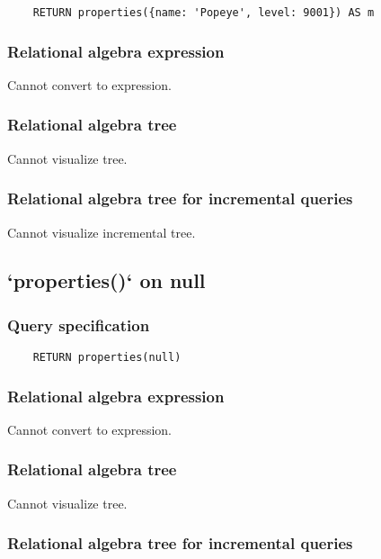 	\begin{lstlisting}
	RETURN properties({name: 'Popeye', level: 9001}) AS m
	\end{lstlisting}


	\subsubsection*{Relational algebra expression}

	Cannot convert to expression.

	\subsubsection*{Relational algebra tree}

	Cannot visualize tree.

	\subsubsection*{Relational algebra tree for incremental queries}

	Cannot visualize incremental tree.
	\subsection{`properties()` on null}

	\subsubsection*{Query specification}

	\begin{lstlisting}
	RETURN properties(null)
	\end{lstlisting}


	\subsubsection*{Relational algebra expression}

	Cannot convert to expression.

	\subsubsection*{Relational algebra tree}

	Cannot visualize tree.

	\subsubsection*{Relational algebra tree for incremental queries}

